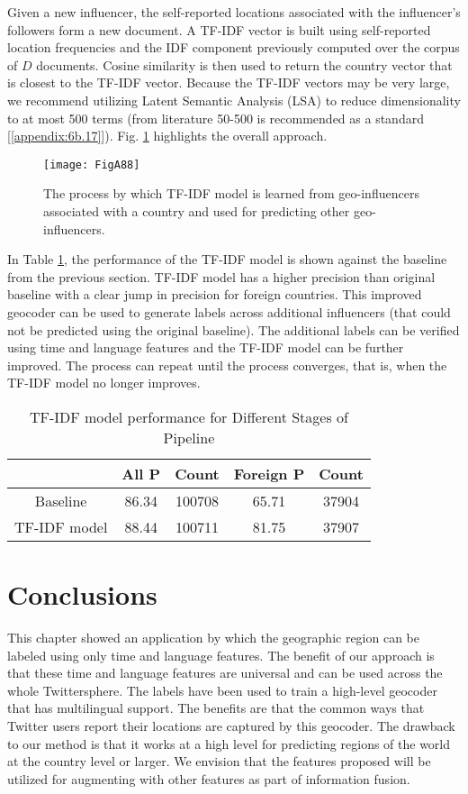 Given a new influencer, the self-reported locations associated with the influencer's followers form a new document. A TF-IDF vector is built using self-reported location frequencies and the IDF component previously computed over the corpus of $D$ documents. Cosine similarity is then used to return the country vector that is closest to the TF-IDF vector. Because the TF-IDF vectors may be very large, we recommend utilizing Latent Semantic Analysis (LSA) to reduce dimensionality to at most 500 terms (from literature 50-500 is recommended as a standard [\ref{appendix:6b.17}]). Fig. \ref{fig_78app} highlights the overall approach. 

\begin{figure}[!t]
\centering
\texttt{[image: FigA88]}
\caption[Training TF-IDF Geocoder]{The process by which TF-IDF model is learned from geo-influencers associated with a country and used for predicting other geo-influencers.}
\label{fig_78app}
\end{figure}

In Table \ref{table_6app}, the performance of the TF-IDF model is shown against the baseline from the previous section. TF-IDF model has a higher precision than original baseline with a clear jump in precision for foreign countries. This improved geocoder can be used to generate labels across additional influencers (that could not be predicted using the original baseline). The additional labels can be verified using time and language features and the TF-IDF model can be further improved. The process can repeat until the process converges, that is, when the TF-IDF model no longer improves.

\begin{table}[htbp]
\small
\caption{TF-IDF model performance for Different Stages of Pipeline}
\label{table_6app}
\centering
\begin{tabular}{|c|c|c|c|c|}
\hline
& \bfseries All P & \bfseries Count & \bfseries Foreign P & \bfseries Count\\
\hline
Baseline & 86.34 & 100708 & 65.71 & 37904 \\
\hline
TF-IDF model & 88.44 & 100711 & 81.75 & 37907 \\
\hline
\end{tabular}
\end{table}

\section{Conclusions}
This chapter showed an application by which the geographic region can be labeled using only time and language features. The benefit of our approach is that these time and language features are universal and can be used across the whole Twittersphere. The labels have been used to train a high-level geocoder that has multilingual support. The benefits are that the common ways that Twitter users report their locations are captured by this geocoder. The drawback to our method is that it works at a high level for predicting regions of the world at the country level or larger. We envision that the features proposed will be utilized for augmenting with other features as part of information fusion.